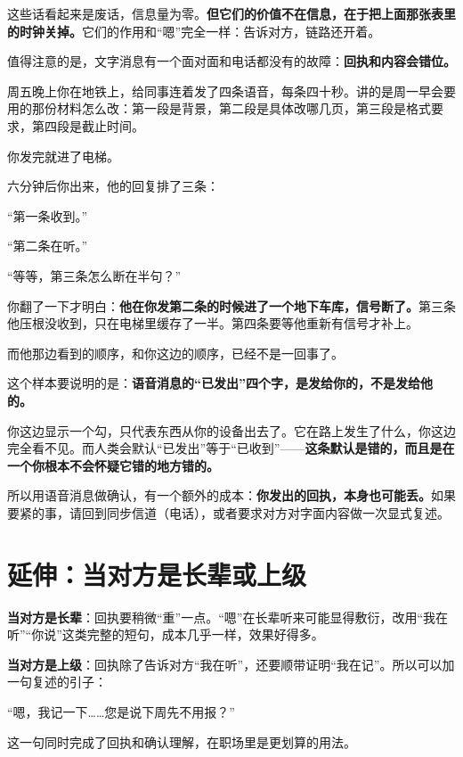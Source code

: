 这些话看起来是废话，信息量为零。\textbf{但它们的价值不在信息，在于把上面那张表里的时钟关掉。}它们的作用和“嗯”完全一样：告诉对方，链路还开着。

值得注意的是，文字消息有一个面对面和电话都没有的故障：\textbf{回执和内容会错位。}

\par
\begin{mdquote}
周五晚上你在地铁上，给同事连着发了四条语音，每条四十秒。讲的是周一早会要用的那份材料怎么改：第一段是背景，第二段是具体改哪几页，第三段是格式要求，第四段是截止时间。

你发完就进了电梯。

六分钟后你出来，他的回复排了三条：

“第一条收到。”

“第二条在听。”

“等等，第三条怎么断在半句？”

你翻了一下才明白：\textbf{他在你发第二条的时候进了一个地下车库，信号断了。}第三条他压根没收到，只在电梯里缓存了一半。第四条要等他重新有信号才补上。

而他那边看到的顺序，和你这边的顺序，已经不是一回事了。
\end{mdquote}

这个样本要说明的是：\textbf{语音消息的“已发出”四个字，是发给你的，不是发给他的。}

你这边显示一个勾，只代表东西从你的设备出去了。它在路上发生了什么，你这边完全看不见。而人类会默认“已发出”等于“已收到”——\textbf{这条默认是错的，而且是在一个你根本不会怀疑它错的地方错的。}

所以用语音消息做确认，有一个额外的成本：\textbf{你发出的回执，本身也可能丢。}如果要紧的事，请回到同步信道（电话），或者要求对方对字面内容做一次显式复述。

\section{延伸：当对方是长辈或上级}

\textbf{当对方是长辈}：回执要稍微“重”一点。“嗯”在长辈听来可能显得敷衍，改用“我在听”“你说”这类完整的短句，成本几乎一样，效果好得多。

\textbf{当对方是上级}：回执除了告诉对方“我在听”，还要顺带证明“我在记”。所以可以加一句复述的引子：

\begin{mdquote}
“嗯，我记一下……您是说下周先不用报？”
\end{mdquote}

这一句同时完成了回执和确认理解，在职场里是更划算的用法。

